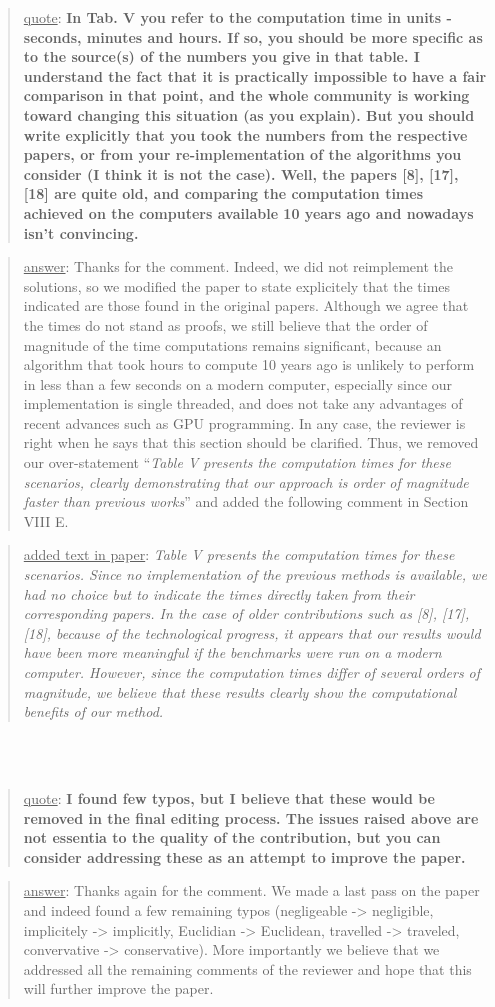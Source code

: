 \documentclass[a4paper]{article}
\newcommand\quot[1]{\begin{quote} \underline{quote}: \textbf{#1}\end{quote}}
\newcommand\as[1]{\begin{quote} \underline{answer}: {#1}\end{quote} }
\newcommand\qt[1]{\begin{quote} \underline{added text in paper}: \textit{#1}\end{quote} \leavevmode \\ }
\begin{document}
\quot{
In Tab. V you refer to the computation time in units - seconds,
minutes and hours. If so, you should be more specific as to the
source(s) of the numbers you give in that table. I understand the fact
that it is practically impossible to have a fair comparison in that
point, and the whole community is working toward changing this
situation (as you explain). But you should write explicitly that you
took the numbers from the respective papers, or from your
re-implementation of the algorithms you consider (I think it is not the
case). Well, the papers [8], [17], [18] are quite old, and comparing
the computation times achieved on the computers available 10 years ago
and nowadays isn't convincing. 
}
\as{Thanks for the comment. Indeed, we did not reimplement the solutions, so we modified the paper to state explicitely that the times indicated are those found in the original papers. Although we agree that the times do not stand as proofs, we still believe that the order of magnitude of the time computations remains significant, because an algorithm that took hours to compute 10 years ago is unlikely to perform in less than a few seconds on a modern computer, especially since our implementation is single threaded, and does not take any advantages of recent advances such as GPU programming. In any case, the reviewer is right when he says that this section should be clarified.
Thus, we removed our over-statement ``\textit{Table V presents the computation times for these scenarios, clearly demonstrating that our approach is order of magnitude faster than previous works}'' and added the following comment in Section VIII E.}
\qt{
Table V presents the computation times for these scenarios. Since no implementation of the previous methods is available, we had no choice but to indicate the times directly taken from their corresponding papers.
In the case of older contributions such as [8], [17], [18], because of the technological progress, it appears that our results would have been more meaningful if the benchmarks were run on a modern computer. However, since the computation times differ of several orders of magnitude, we believe that these results clearly show the computational benefits of our method.
}
\leavevmode \\

\quot{I found few typos, but I believe that these would be removed in the
final editing process. 
The issues raised above are not essentia to the quality of the
contribution, but you can consider addressing these as an attempt to
improve the paper. }
\as{Thanks again for the comment. We made a last pass on the paper and indeed found a few remaining typos (negligeable -> negligible, implicitely -> implicitly, Euclidian -> Euclidean, travelled -> traveled, convervative -> conservative). More importantly we believe that we addressed all the remaining comments of the reviewer and hope that this will further improve the paper.}
\end{document}
